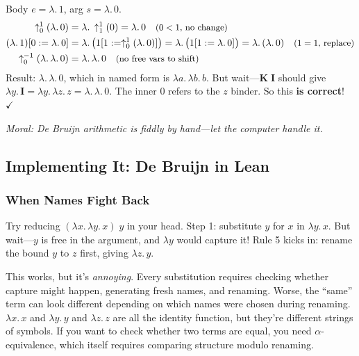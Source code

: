\documentclass[11pt,a4paper]{article}
\theoremstyle{definition}
\newcommand{\lam}{\lambda}
\newcommand{\rmark}[1]{\quad\text{\small(#1)}}
\begin{document}
\begin{workedexample}[De Bruijn: $(\lam.\,\lam.\, 1)\;(\lam.\, 0)$ \;{\small(i.e., $\mathbf{K}\;\mathbf{I}$)}]
Body $e = \lam.\, 1$, \; arg $s = \lam.\, 0$.
\begin{align*}
  \uparrow^1_0(\lam.\, 0) &= \lam.\, \uparrow^1_1(0) = \lam.\, 0
    \rmark{$0 < 1$, no change} \\
  (\lam.\, 1)[0 := \lam.\, 0]
    &= \lam.\, \bigl(1[1 := \uparrow^1_0(\lam.\, 0)]\bigr)
     = \lam.\, \bigl(1[1 := \lam.\, 0]\bigr)
     = \lam.\, (\lam.\, 0)
    \rmark{$1 = 1$, replace} \\
  \uparrow^{-1}_0(\lam.\, \lam.\, 0) &= \lam.\, \lam.\, 0
    \rmark{no free vars to shift}
\end{align*}
Result: $\lam.\,\lam.\, 0$, which in named form is $\lam a.\,\lam b.\, b$. But
wait---$\mathbf{K}\;\mathbf{I}$ should give $\lam y.\, \mathbf{I} = \lam y.\, \lam z.\, z = \lam.\,\lam.\, 0$. The inner 0 refers to the $z$ binder. So this \textbf{is correct}! $\checkmark$

\medskip
\textit{Moral: De Bruijn arithmetic is fiddly by hand---let the computer handle it.}
\end{workedexample}




\subsection{Implementing It: De Bruijn in Lean}\label{sec:dbimpl}

\subsubsection{When Names Fight Back}

Try reducing $(\lam x.\, \lam y.\, x)\; y$ in your head. Step 1: substitute
$y$ for $x$ in $\lam y.\, x$. But wait---$y$ is free in the argument, and
$\lam y$ would capture it! Rule 5 kicks in: rename the bound $y$ to $z$
first, giving $\lam z.\, y$.

This works, but it's \emph{annoying}. Every substitution requires checking
whether capture might happen, generating fresh names, and renaming. Worse, the
``same'' term can look different depending on which names were chosen during
renaming. $\lam x.\, x$ and $\lam y.\, y$ and $\lam z.\, z$ are all the
identity function, but they're different strings of symbols. If you want to
check whether two terms are equal, you need $\alpha$-equivalence, which itself
requires comparing structure modulo renaming.
\end{document}
